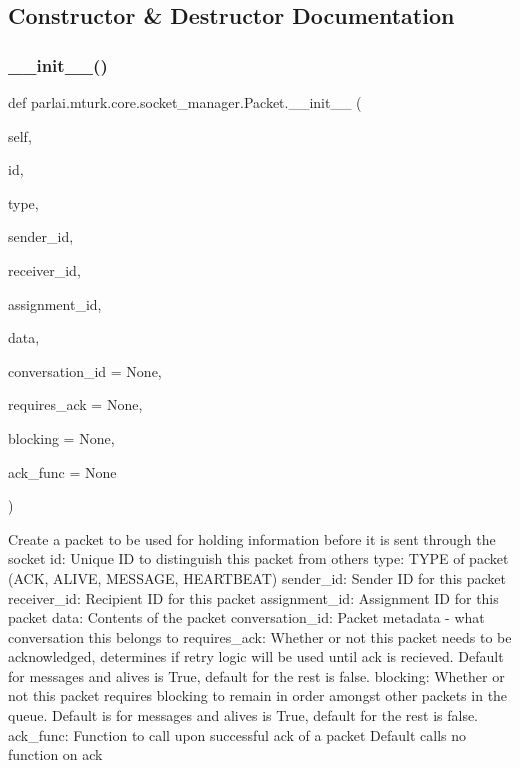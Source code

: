 \subsection{Constructor \& Destructor Documentation}
\mbox{\label{classparlai_1_1mturk_1_1core_1_1socket__manager_1_1Packet_a25f1f794ffd01fb70e9b6b8acd0a33be}} 
\subsubsection{\texorpdfstring{\+\_\+\+\_\+init\+\_\+\+\_\+()}{\_\_init\_\_()}}
{\footnotesize\ttfamily def parlai.\+mturk.\+core.\+socket\+\_\+manager.\+Packet.\+\_\+\+\_\+init\+\_\+\+\_\+ (\begin{DoxyParamCaption}\item[{}]{self,  }\item[{}]{id,  }\item[{}]{type,  }\item[{}]{sender\+\_\+id,  }\item[{}]{receiver\+\_\+id,  }\item[{}]{assignment\+\_\+id,  }\item[{}]{data,  }\item[{}]{conversation\+\_\+id = {\ttfamily None},  }\item[{}]{requires\+\_\+ack = {\ttfamily None},  }\item[{}]{blocking = {\ttfamily None},  }\item[{}]{ack\+\_\+func = {\ttfamily None} }\end{DoxyParamCaption})}

\begin{DoxyVerb}Create a packet to be used for holding information before it is
sent through the socket
id:               Unique ID to distinguish this packet from others
type:             TYPE of packet (ACK, ALIVE, MESSAGE, HEARTBEAT)
sender_id:        Sender ID for this packet
receiver_id:      Recipient ID for this packet
assignment_id:    Assignment ID for this packet
data:             Contents of the packet
conversation_id:  Packet metadata - what conversation this belongs to
requires_ack:     Whether or not this packet needs to be acknowledged,
           determines if retry logic will be used until ack is
           recieved. Default for messages and alives is True,
           default for the rest is false.
blocking:         Whether or not this packet requires blocking to
           remain in order amongst other packets in the queue.
           Default is for messages and alives is True, default
           for the rest is false.
ack_func:         Function to call upon successful ack of a packet
           Default calls no function on ack
\end{DoxyVerb}
 


